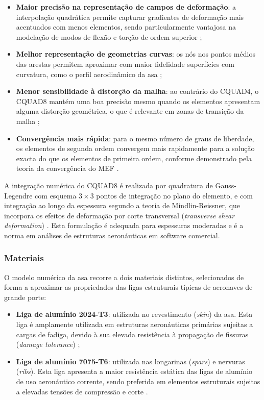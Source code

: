 \documentclass[a4paper,fleqn,noprintline]{cas-dc}
\begin{document}
\begin{itemize}
    \item \textbf{Maior precisão na representação de campos de deformação}: a interpolação quadrática permite capturar gradientes de deformação mais acentuados com menos elementos, sendo particularmente vantajosa na modelação de modos de flexão e torção de ordem superior \cite{Bathe2014};

    \item \textbf{Melhor representação de geometrias curvas}: os nós nos pontos médios das arestas permitem aproximar com maior fidelidade superfícies com curvatura, como o perfil aerodinâmico da asa \cite{Zienkiewicz2005};

    \item \textbf{Menor sensibilidade à distorção da malha}: ao contrário do CQUAD4, o CQUAD8 mantém uma boa precisão mesmo quando os elementos apresentam alguma distorção geométrica, o que é relevante em zonas de transição da malha \cite{Cook2001};

    \item \textbf{Convergência mais rápida}: para o mesmo número de graus de liberdade, os elementos de segunda ordem convergem mais rapidamente para a solução exacta do que os elementos de primeira ordem, conforme demonstrado pela teoria da convergência do MEF \cite{Bathe2014}.
\end{itemize}

A integração numérica do CQUAD8 é realizada por quadratura de Gauss-Legendre com esquema $3 \times 3$ pontos de integração no plano do elemento, e com integração ao longo da espessura segundo a teoria de Mindlin-Reissner, que incorpora os efeitos de deformação por corte transversal (\textit{transverse shear deformation}) \cite{Nastran2014}. Esta formulação é adequada para espessuras moderadas e é a norma em análises de estruturas aeronáuticas em software comercial.

\subsubsection{Materiais}

O modelo numérico da asa recorre a dois materiais distintos, selecionados de forma a aproximar as propriedades das ligas estruturais típicas de aeronaves de grande porte:

\begin{itemize}
    \item \textbf{Liga de alumínio 2024-T3}: utilizada no revestimento (\textit{skin}) da asa. Esta liga é amplamente utilizada em estruturas aeronáuticas primárias sujeitas a cargas de fadiga, devido à sua elevada resistência à propagação de fissuras (\textit{damage tolerance}) \cite{Megson2012, ASM2008};

    \item \textbf{Liga de alumínio 7075-T6}: utilizada nas longarinas (\textit{spars}) e nervuras (\textit{ribs}). Esta liga apresenta a maior resistência estática das ligas de alumínio de uso aeronáutico corrente, sendo preferida em elementos estruturais sujeitos a elevadas tensões de compressão e corte \cite{Megson2012, ASM2008}.
\end{itemize}
\end{document}

